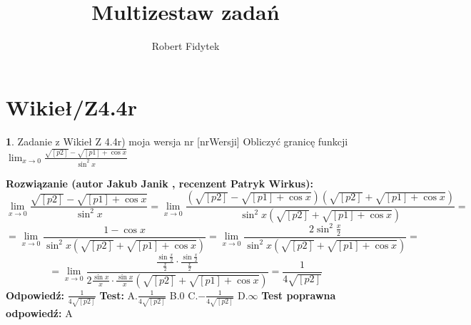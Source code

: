 \documentclass[12pt, a4paper]{article}
\title{Multizestaw zadań}
\author{Robert Fidytek}
\date{}
\theoremstyle{definition} %
\newtheorem{zad}{}
\newcommand{\kategoria}[1]{\section{#1}} %
\newcommand{\zadStart}[1]{\begin{zad}#1\newline} %
\newcommand{\zadStop}{\end{zad}}   %
\newcommand{\rozwStart}[2]{\noindent \textbf{Rozwiązanie (autor #1 , recenzent #2): }\newline} %
\newcommand{\rozwStop}{\newline}                                            %
\newcommand{\odpStart}{\noindent \textbf{Odpowiedź:}\newline}    %
\newcommand{\odpStop}{\newline}                                             %
\newcommand{\testStart}{\noindent \textbf{Test:}\newline} %
\newcommand{\testStop}{\newline} %
\newcommand{\kluczStart}{\noindent \textbf{Test poprawna odpowiedź:}\newline} %
\newcommand{\kluczStop}{\newline} %
\begin{document}
\maketitle


\kategoria{Wikieł/Z4.4r}
\zadStart{Zadanie z Wikieł Z 4.4r) moja wersja nr [nrWersji]}
Obliczyć granicę funkcji $\lim_{x \to 0} \frac{\sqrt{[p2]}-\sqrt{[p1]+\cos{x}}}{\sin^2{x}}$
\zadStop
\rozwStart{Jakub Janik}{Patryk Wirkus}
$$\lim_{x \to 0} \frac{\sqrt{[p2]}-\sqrt{[p1]+\cos{x}}}{\sin^2{x}}=\lim_{x \to 0} \frac{(\sqrt{[p2]}-\sqrt{[p1]+\cos{x}})(\sqrt{[p2]}+\sqrt{[p1]+\cos{x}})}{\sin^2{x}(\sqrt{[p2]}+\sqrt{[p1]+\cos{x}})}=$$
$$=\lim_{x \to 0} \frac{1-\cos{x}}{\sin^2{x}(\sqrt{[p2]}+\sqrt{[p1]+\cos{x}})}=\lim_{x \to 0} \frac{2\sin^2{\frac{x}{2}}}{\sin^2{x}(\sqrt{[p2]}+\sqrt{[p1]+\cos{x}})}=$$
$$=\lim_{x \to 0} \frac{\frac{\sin{\frac{x}{2}}}{\frac{x}{2}}\cdot\frac{\sin{\frac{x}{2}}}{\frac{x}{2}}}{2\frac{\sin{x}}{x}\cdot\frac{\sin{x}}{x}(\sqrt{[p2]}+\sqrt{[p1]+\cos{x}})}=\frac{1}{4\sqrt{[p2]}}$$
\rozwStop
\odpStart
$\frac{1}{4\sqrt{[p2]}}$
\odpStop
\testStart
A.$\frac{1}{4\sqrt{[p2]}}$
B.$0$
C.$-\frac{1}{4\sqrt{[p2]}}$
D.$\infty$
\testStop
\kluczStart
A
\kluczStop
\end{document}
